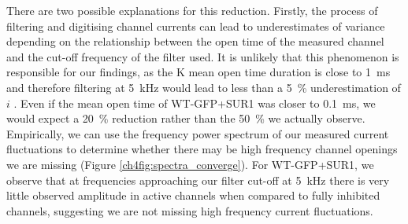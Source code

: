 There are two possible explanations for this reduction.
Firstly, the process of filtering and digitising channel currents can lead to underestimates of variance depending on the relationship between the open time of the measured channel and the cut-off frequency of the filter used.
It is unlikely that this phenomenon is responsible for our findings, as the K\ATP{} mean open time duration is close to \SI{1}{\milli\second} and therefore filtering at \SI{5}{\kilo\hertz} would lead to less than a \SI{5}{\percent} underestimation of $i$ \cite{}.
Even if the mean open time of WT-GFP+SUR1 was closer to \SI{0.1}{\milli\second}, we would expect a \SI{20}{\percent} reduction rather than the \SI{50}{\percent} we actually observe.
Empirically, we can use the frequency power spectrum of our measured current fluctuations to determine whether there may be high frequency channel openings we are missing (Figure \ref{ch4fig:spectra_converge}).
For WT-GFP+SUR1, we observe that at frequencies approaching our filter cut-off at \SI{5}{\kilo\hertz} there is very little observed amplitude in active channels when compared to fully inhibited channels, suggesting we are not missing high frequency current fluctuations.

